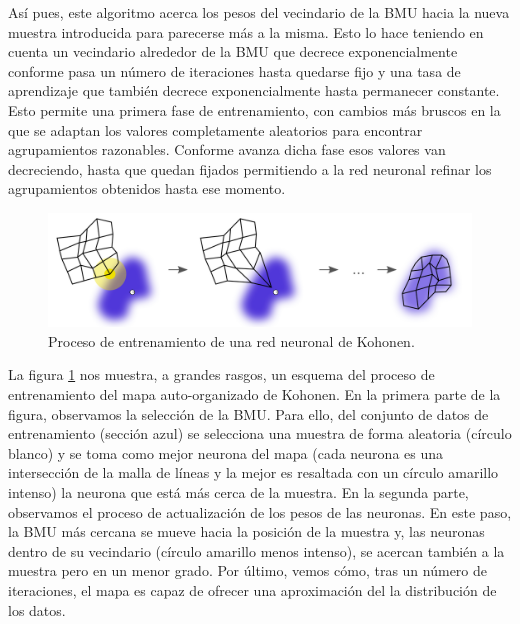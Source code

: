 Así pues, este algoritmo acerca los pesos del vecindario de la BMU hacia la nueva muestra introducida para parecerse más a la misma. Esto lo hace teniendo en cuenta un vecindario alrededor de la BMU que decrece exponencialmente conforme pasa un número de iteraciones hasta quedarse fijo y una tasa de aprendizaje que también decrece exponencialmente hasta permanecer constante. \\

Esto permite una primera fase de entrenamiento, con cambios más bruscos en la que se adaptan los valores completamente aleatorios para encontrar agrupamientos razonables. Conforme avanza dicha fase esos valores van decreciendo, hasta que quedan fijados permitiendo a la red neuronal refinar los agrupamientos obtenidos hasta ese momento.\\

\begin{figure}[H]
\centering
\includegraphics[width=1.0\textwidth]{imagenes/somtraining.png}
\caption{Proceso de entrenamiento de una red neuronal de Kohonen.}
\label{img:somtraining}
\end{figure}

La figura \ref{img:somtraining} nos muestra, a grandes rasgos, un esquema del proceso de entrenamiento del mapa auto-organizado de Kohonen. En la primera parte de la figura, observamos la selección de la BMU. Para ello, del conjunto de datos de entrenamiento (sección azul) se selecciona una muestra de forma aleatoria (círculo blanco) y se toma como mejor neurona del mapa (cada neurona es una intersección de la malla de líneas y la mejor es resaltada con un círculo amarillo intenso) la neurona que está más cerca de la muestra. En la segunda parte, observamos el proceso de actualización de los pesos de las neuronas. En este paso, la BMU más cercana se mueve hacia la posición de la muestra y, las neuronas dentro de su vecindario (círculo amarillo menos intenso), se acercan también a la muestra pero en un menor grado. Por último, vemos cómo, tras un número de iteraciones, el mapa es capaz de ofrecer una aproximación del la distribución de los datos.
